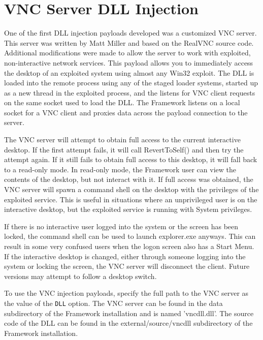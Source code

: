\documentclass{report}
\begin{document}
\section{VNC Server DLL Injection}
\par
One of the first DLL injection payloads developed was a customized VNC server.
This server was written by Matt Miller and based on the RealVNC source code.
Additional modifications were made to allow the server to work with exploited,
non-interactive network services. This payload allows you to immediately access
the desktop of an exploited system using almost any Win32 exploit. The DLL is
loaded into the remote process using any of the staged loader systems, started
up as a new thread in the exploited process, and the listens for VNC client
requests on the same socket used to load the DLL. The Framework listens
on a local socket for a VNC client and proxies data across the payload
connection to the server.

\par
The VNC server will attempt to obtain full access to the current interactive
desktop. If the first attempt fails, it will call RevertToSelf() and then try
the attempt again. If it still fails to obtain full access to this desktop, it
will fall back to a read-only mode. In read-only mode, the Framework user can
view the contents of the desktop, but not interact with it. If full access was
obtained, the VNC server will spawn a command shell on the desktop with the
privileges of the exploited service. This is useful in situations where an
unprivileged user is on the interactive desktop, but the exploited service is
running with System privileges.

\par
If there is no interactive user logged into the system or the screen has been
locked, the command shell can be used to launch explorer.exe anyways. This can
result in some very confused users when the logon screen also has a Start Menu.
If the interactive desktop is changed, either through someone logging into the
system or locking the screen, the VNC server will disconnect the client. Future
versions may attempt to follow a desktop switch.

\par
To use the VNC injection payloads, specify the full path to the VNC server as
the value of the \texttt{DLL} option. The VNC server can be found in the data
subdirectory of the Framework installation and is named 'vncdll.dll'. The source
code of the DLL can be found in the external/source/vncdll
subdirectory of the Framework installation.
\end{document}
